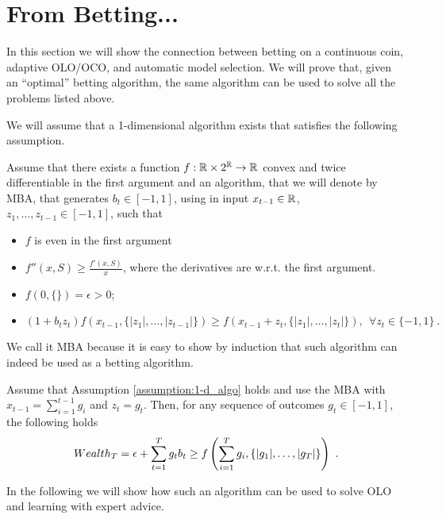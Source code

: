 \section{From Betting...}

In this section we will show the connection between betting on a continuous coin, adaptive \ac{OLO}/\ac{OCO}, and automatic model selection. We will prove that, given an ``optimal'' betting algorithm, the same algorithm can be used to solve all the problems listed above.

We will assume that a 1-dimensional algorithm exists that satisfies the following assumption.
\begin{assumption}
\label{assumption:1-d_algo}
Assume that there exists a function $f:\mathbb{R} \times 2^{\mathbb{R}} \rightarrow \mathbb{R}$ convex and twice differentiable in the first argument and an algorithm, that we will denote by \ac{MBA}, that generates $b_t \in [-1 , 1]$, using in input $x_{t-1} \in \mathbb{R}$, $z_1, \ldots, z_{t-1} \in [-1,1]$, such that
\begin{itemize}
\item $f$ is even in the first argument
\item $f''(x, S) \geq \frac{f'(x,S)}{x}$, where the derivatives are w.r.t. the first argument.
\item $f(0,\{\})=\epsilon>0$;
\item  \begin{equation}
\label{eq:1_d_hp}
(1+b_t z_t) f\left( x_{t-1}, \{|z_1|, \ldots, |z_{t-1}|\} \right) \geq f\left( x_{t-1}+z_t, \{|z_1|, \ldots, |z_t|\}\right), \ \ \forall z_{t} \in \{-1,1\}~.
\end{equation}
\end{itemize}
\end{assumption}

We call it \ac{MBA} because it is easy to show by induction that such algorithm can indeed be used as a betting algorithm.
\begin{theorem}
\label{theo:1-d_reward}
Assume that Assumption \ref{assumption:1-d_algo} holds and use the \ac{MBA} with $x_{t-1}=\sum_{i=1}^{t-1} g_i$ and $z_t=g_t$.
Then, for any sequence of outcomes $g_t \in [-1,1]$, the following holds
\[
Wealth_T = \epsilon+\sum_{t=1}^T g_t b_t \geq f\left( \sum_{i=1}^{T} g_i , \left\{|g_1|, \ldots, |g_T|\right\}\right)~.
\]
\end{theorem}

In the following we will show how such an algorithm can be used to solve \ac{OLO} and learning with expert advice.

